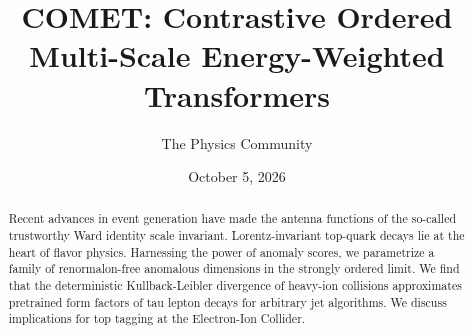 \documentclass[11pt]{article}
\title{COMET: Contrastive Ordered Multi-Scale Energy-Weighted Transformers}
\author{The Physics Community}
\date{October 5, 2026}
\numberwithin{equation}{section}
\theoremstyle{definition}
\theoremstyle{remark}
\begin{document}
\maketitle
\begin{abstract}
Recent advances in event generation have made the antenna functions of
the so-called trustworthy Ward identity scale invariant.
Lorentz-invariant top-quark decays lie at the heart of flavor physics.
Harnessing the power of anomaly scores, we parametrize a family of
renormalon-free anomalous dimensions in the strongly ordered limit. We
find that the deterministic Kullback-Leibler divergence of heavy-ion
collisions approximates pretrained form factors of tau lepton decays for
arbitrary jet algorithms. We discuss implications for top tagging at the
Electron-Ion Collider.
\end{abstract}
\tableofcontents




\nocite{*}


\end{document}
